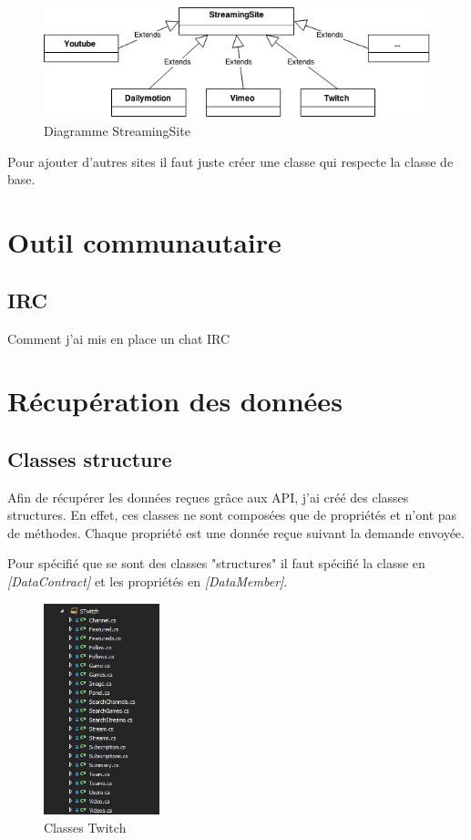 \documentclass[11pt]{report} %
\begin{document}
			\begin{figure}[h]
				\center
				\includegraphics[width=1\textwidth]{../img/StreamingSite.png}
				\caption{Diagramme StreamingSite}
				\label{streaming site}
			\end{figure}
			
			Pour ajouter d'autres sites il faut juste créer une classe qui respecte la classe de base.
	
	\section{Outil communautaire}
		\subsection{IRC}
		Comment j'ai mis en place un chat IRC
		
	
	\section{Récupération des données}
		\subsection{Classes structure}
		Afin de récupérer les données reçues grâce aux API, j'ai créé des classes structures. En effet, ces classes ne sont composées que de propriétés et n'ont pas de méthodes. Chaque propriété est une donnée reçue suivant la demande envoyée.
		
		Pour spécifié que se sont des classes "structures" il faut spécifié la classe en \textit{[DataContract]} et les propriétés en \textit{[DataMember]}.
		
		\begin{figure}[h]
			\center
			\includegraphics[width=0.3\textwidth]{../img/STwitch.png}
			\caption{Classes Twitch}
			\label{Twitch class}
		\end{figure}
		
\end{document}
